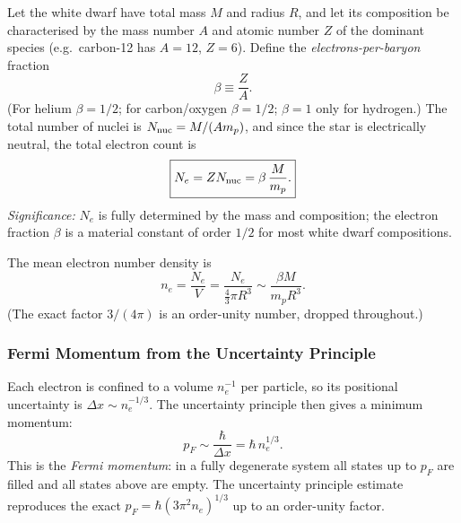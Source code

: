 Let the white dwarf have total mass $M$ and radius $R$, and let its composition
be characterised by the mass number $A$ and atomic number $Z$ of the dominant
species (e.g.\ carbon-12 has $A=12$, $Z=6$). Define the
\emph{electrons-per-baryon} fraction
\begin{equation}
    \beta \equiv \frac{Z}{A}.
    \label{eq:lec10:beta}
\end{equation}
(For helium $\beta=1/2$; for carbon/oxygen $\beta=1/2$; $\beta=1$ only for
hydrogen.) The total number of nuclei is $N_{\rm nuc} = M/(Am_p)$, and since
the star is electrically neutral, the total electron count is
\begin{equation}
    \boxed{
    N_e = Z N_{\rm nuc} = \beta\,\frac{M}{m_p}.
    }
    \label{eq:lec10:Ne}
\end{equation}
\textit{Significance:} $N_e$ is fully determined by the mass and composition; the
electron fraction $\beta$ is a material constant of order $1/2$ for most white
dwarf compositions.

The mean electron number density is
\begin{equation}
    n_e = \frac{N_e}{V} = \frac{N_e}{\tfrac{4}{3}\pi R^3}
    \sim \frac{\beta M}{m_p R^3}.
    \label{eq:lec10:ne}
\end{equation}
(The exact factor $3/(4\pi)$ is an order-unity number, dropped throughout.)

\subsubsection*{Fermi Momentum from the Uncertainty Principle}

Each electron is confined to a volume $n_e^{-1}$ per particle, so its
positional uncertainty is $\Delta x \sim n_e^{-1/3}$. The uncertainty principle
then gives a minimum momentum:
\begin{equation}
    p_F \sim \frac{\hbar}{\Delta x} = \hbar\,n_e^{1/3}.
    \label{eq:lec10:pF}
\end{equation}
This is the \emph{Fermi momentum}: in a fully degenerate system all states up to
$p_F$ are filled and all states above are empty. The uncertainty principle
estimate reproduces the exact $p_F = \hbar(3\pi^2 n_e)^{1/3}$ up to an
order-unity factor.


